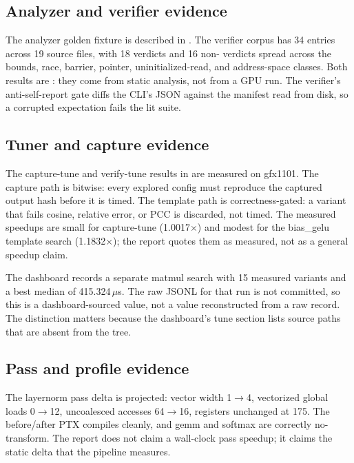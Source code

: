 \subsection{Analyzer and verifier evidence}
\label{sec:eval-static}

The analyzer golden fixture is described in . The
verifier corpus has 34 entries across 19 source files, with 18 
verdicts and 16 non- verdicts spread across the bounds, race,
barrier, pointer, uninitialized-read, and address-space classes. Both results
are : they come from static analysis, not from a GPU run. The
verifier's anti-self-report gate diffs the CLI's JSON against the manifest read
from disk, so a corrupted expectation fails the lit suite.

\subsection{Tuner and capture evidence}
\label{sec:eval-live}

The capture-tune and verify-tune results in  are measured on
gfx1101. The capture path is bitwise: every explored config must reproduce the
captured output hash before it is timed. The template path is
correctness-gated: a variant that fails cosine, relative error, or PCC is
discarded, not timed. The measured speedups are small for capture-tune
(1.0017$\times$) and modest for the bias\_gelu template search
(1.1832$\times$); the report quotes them as measured, not as a general
speedup claim.

The dashboard records a separate matmul search with 15 measured variants and a
best median of 415.324\,$\mu$s. The raw JSONL for that run is not committed,
so this is a dashboard-sourced value, not a value reconstructed from a raw
record. The distinction matters because the dashboard's tune section lists
source paths that are absent from the tree.

\subsection{Pass and profile evidence}
\label{sec:eval-projected}

The layernorm pass delta is projected: vector width 1$\rightarrow$4,
vectorized global loads 0$\rightarrow$12, uncoalesced accesses
64$\rightarrow$16, registers unchanged at 175. The before/after PTX compiles
cleanly, and gemm and softmax are correctly no-transform. The report does not
claim a wall-clock pass speedup; it claims the static delta that the pipeline
measures.

